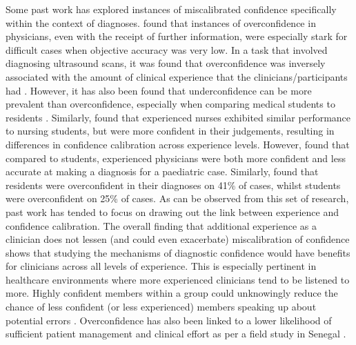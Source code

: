 \documentclass[a4paper, nobind]{templates/ociamthesis}
\begin{document}
\hfill\break
Some past work has explored instances of miscalibrated confidence specifically within the context of diagnoses. \autocite{meyer_physicians_2013} found that instances of overconfidence in physicians, even with the receipt of further information, were especially stark for difficult cases when objective accuracy was very low. In a task that involved diagnosing ultrasound scans, it was found that overconfidence was inversely associated with the amount of clinical experience that the clinicians/participants had \autocite{schoenherr_subjective_2018}. However, it has also been found that underconfidence can be more prevalent than overconfidence, especially when comparing medical students to residents \autocite{schoenherr_subjective_2018}. Similarly, \autocite{yang_nurses_2010} found that experienced nurses exhibited similar performance to nursing students, but were more confident in their judgements, resulting in differences in confidence calibration across experience levels. However, \autocite{brezis_does_2019} found that compared to students, experienced physicians were both more confident and less accurate at making a diagnosis for a paediatric case. Similarly, \autocite{friedman_physicians_2005} found that residents were overconfident in their diagnoses on 41\% of cases, whilst students were overconfident on 25\% of cases. As can be observed from this set of research, past work has tended to focus on drawing out the link between experience and confidence calibration. The overall finding that additional experience as a clinician does not lessen (and could even exacerbate) miscalibration of confidence shows that studying the mechanisms of diagnostic confidence would have benefits for clinicians across all levels of experience. This is especially pertinent in healthcare environments where more experienced clinicians tend to be listened to more. Highly confident members within a group could unknowingly reduce the chance of less confident (or less experienced) members speaking up about potential errors \autocite{hemon_speaking_2020}. Overconfidence has also been linked to a lower likelihood of sufficient patient management and clinical effort as per a field study in Senegal \autocite{kovacs_overconfident_2020}.
\end{document}
